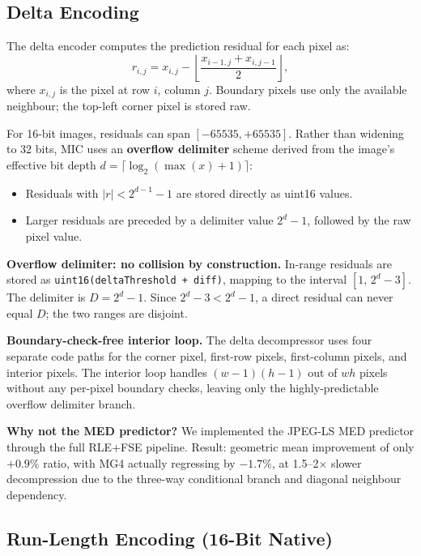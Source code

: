 \documentclass[journal]{IEEEtran}
\begin{document}
\subsection{Delta Encoding}

The delta encoder computes the prediction residual for each pixel as:
\begin{equation}
  r_{i,j} = x_{i,j} - \left\lfloor \frac{x_{i-1,j} + x_{i,j-1}}{2}
  \right\rfloor,
\end{equation}
where $x_{i,j}$ is the pixel at row $i$, column $j$. Boundary pixels use only
the available neighbour; the top-left corner pixel is stored raw.

For 16-bit images, residuals can span $[-65535, +65535]$. Rather than widening
to 32 bits, MIC uses an \textbf{overflow delimiter} scheme derived from the
image's effective bit depth $d = \lceil\log_2(\max(x)+1)\rceil$:
\begin{itemize}
  \item Residuals with $|r| < 2^{d-1}-1$ are stored directly as uint16 values.
  \item Larger residuals are preceded by a delimiter value $2^d - 1$, followed
  by the raw pixel value.
\end{itemize}

\textbf{Overflow delimiter: no collision by construction.} In-range residuals
are stored as \texttt{uint16(deltaThreshold + diff)}, mapping to the interval
$[1,\, 2^d-3]$. The delimiter is $D = 2^d - 1$. Since $2^d-3 < 2^d-1$, a
direct residual can never equal $D$; the two ranges are disjoint.

\textbf{Boundary-check-free interior loop.} The delta decompressor uses four
separate code paths for the corner pixel, first-row pixels, first-column pixels,
and interior pixels. The interior loop handles $(w-1)(h-1)$ out of $wh$ pixels
without any per-pixel boundary checks, leaving only the highly-predictable
overflow delimiter branch.

\textbf{Why not the MED predictor?} We implemented the JPEG-LS MED predictor
through the full RLE+FSE pipeline. Result: geometric mean improvement of only
$+0.9\%$ ratio, with MG4 actually regressing by $-1.7\%$, at 1.5--2$\times$
slower decompression due to the three-way conditional branch and diagonal
neighbour dependency.

\subsection{Run-Length Encoding (16-Bit Native)}
\end{document}
